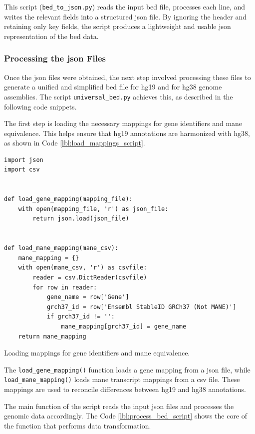This script (\texttt{bed\_to\_json.py}) reads the input \ac{bed} file, processes each line, and writes the relevant fields into a structured \ac{json} file. By ignoring the header and retaining only key fields, the script produces a lightweight and usable \ac{json} representation of the \ac{bed} data.

\subsubsection{\textbf{Processing the \ac{json} Files}}

Once the \ac{json} files were obtained, the next step involved processing these files to generate a unified and simplified \ac{bed} file for \ac{hg19} and for \ac{hg38} genome assemblies. The script \texttt{universal\_bed.py} achieves this, as described in the following code snippets.

The first step is loading the necessary mappings for gene identifiers and \ac{mane} equivalence. This helps ensure that \ac{hg19} annotations are harmonized with \ac{hg38}, as shown in Code \ref{lbl:load_mappings_script}.

\begin{longlisting}
\begin{verbatim}
import json
import csv


def load_gene_mapping(mapping_file):
    with open(mapping_file, 'r') as json_file:
        return json.load(json_file)


def load_mane_mapping(mane_csv):
    mane_mapping = {}
    with open(mane_csv, 'r') as csvfile:
        reader = csv.DictReader(csvfile)
        for row in reader:
            gene_name = row['Gene']
            grch37_id = row['Ensembl StableID GRCh37 (Not MANE)']
            if grch37_id != '':
                mane_mapping[grch37_id] = gene_name
    return mane_mapping
\end{verbatim}
\caption{Loading mappings for gene identifiers and \ac{mane} equivalence.}
\label{lbl:load_mappings_script}
\end{longlisting}

The \texttt{load\_gene\_mapping()} function loads a gene mapping from a \ac{json} file, while \texttt{load\_mane\_mapping()} loads \ac{mane} transcript mappings from a \ac{csv} file. These mappings are used to reconcile differences between \ac{hg19} and \ac{hg38} annotations.

The main function of the script reads the input \ac{json} files and processes the genomic data accordingly. The Code \ref{lbl:process_bed_script} shows the core of the function that performs data transformation.

